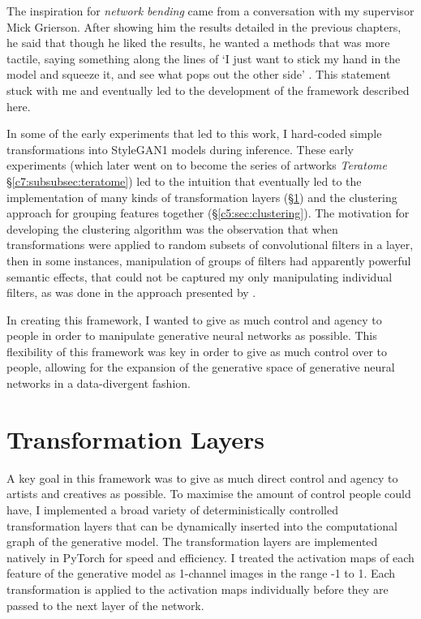 The inspiration for \textit{network bending} came from a conversation with my supervisor Mick Grierson.
After showing him the results detailed in the previous chapters, he said that though he liked the results, he wanted a methods that was more tactile, saying something along the lines of `I just want to stick my hand in the model and squeeze it, and see what pops out the other side'  \citep{grierson2020personal}. 
This statement stuck with me and eventually led to the development of the framework described here.

In some of the early experiments that led to this work, I hard-coded simple transformations into StyleGAN1 \citep{karras2019style} models during inference.
These early experiments (which later went on to become the series of artworks \textit{Teratome} \S \ref{c7:subsubsec:teratome}) led to the intuition that eventually led to the implementation of many kinds of transformation layers (\S \ref{c5:sec:transforms}) and the clustering approach for grouping features together  (\S \ref{c5:sec:clustering}).
The motivation for developing the clustering algorithm was the observation that when transformations were applied to random subsets of convolutional filters in a layer, then in some instances, manipulation of groups of filters had apparently powerful semantic effects, that could not be captured my only manipulating individual filters, as was done in the approach presented by \citep{bau2019semantic}.

In creating this framework, I wanted to give as much control and agency to people in order to manipulate generative neural networks as possible. 
This flexibility of this framework was key in order to give as much control over to people, allowing for the expansion of the generative space of generative neural networks in a data-divergent fashion.

\section{Transformation Layers}

\label{c5:sec:transforms}

A key goal in this framework was to give as much direct control and agency to artists and creatives as possible.
To maximise the amount of control people could have, I implemented a broad variety of deterministically controlled transformation layers that can be dynamically inserted into the computational graph of the generative model. 
The transformation layers are implemented natively in PyTorch \citep{paszke2019pytorch} for speed and efficiency. I
 treated the activation maps of each feature of the generative model as 1-channel images in the range -1 to 1. 
 Each transformation is applied to the activation maps individually before they are passed to the next layer of the network. 


